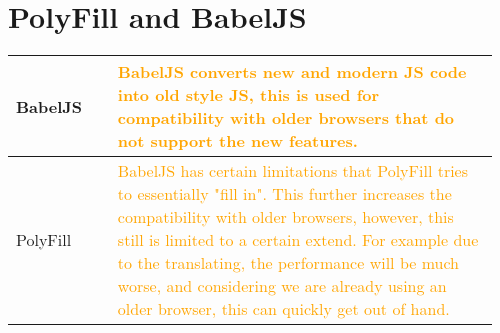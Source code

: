 \documentclass[main.tex,fontsize=8pt,paper=a4,paper=portrait,DIV=calc,]{scrartcl}
\begin{document}
\pagebreak
\begin{table}[ht!]
\section{PolyFill and BabelJS}
\begin{tabular}{|m{0.2\linewidth}|m{0.755\linewidth}|}
\hline
BabelJS & 
\textcolor{orange}{BabelJS converts new and modern JS code into old style JS, this is used for compatibility with older browsers that do not support the new features.}\\
\hline
PolyFill &
\textcolor{orange}{BabelJS has certain limitations that PolyFill tries to essentially "fill in". This further increases the compatibility with older browsers, however, this still is limited to a certain extend.\newline
For example due to the translating, the performance will be much worse, and considering we are already using an older browser, this can quickly get out of hand.}\\
\hline

\hline

\hline

\hline

\hline

\hline

\hline

\hline

\hline
\end{tabular}
\end{table}
\end{document}
